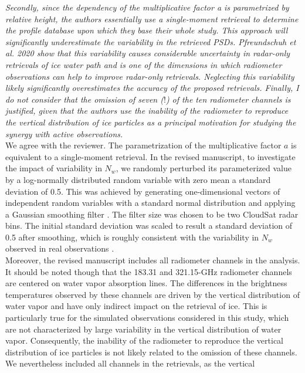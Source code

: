 \documentclass[12pt]{article}
\begin{document}
\noindent \textit{Secondly, since the dependency of the multiplicative factor a is parametrized by relative height,
the authors essentially use a single-moment retrieval to determine the profile database upon
which they base their whole study. This approach will significantly underestimate the variability
in the retrieved PSDs. Pfreundschuh et al. 2020 show that this variability causes considerable
uncertainty in radar-only retrievals of ice water path and is one of the dimensions in which
radiometer observations can help to improve radar-only retrievals. Neglecting this variability
likely significantly overestimates the accuracy of the proposed retrievals.
Finally, I do not consider that the omission of seven ($!$) of the ten radiometer channels is justified,
given that the authors use the inability of the radiometer to reproduce the vertical distribution of
ice particles as a principal motivation for studying the synergy with active observations.}\\
\newline
We agree with the reviewer. The parametrization of the multiplicative factor $a$ is equivalent to a single-moment retrieval. In the revised
manuscript, to investigate the impact of variability in $N_w$, we randomly perturbed its parameterized value by a log-normally distributed
random variable with zero mean a standard deviation of 0.5. This was achieved by generating one-dimensional vectors of independent random variables
with a standard normal distribution and applying a Gaussian smoothing filter \cite{nixon2019}.  The filter size was chosen to be two CloudSat radar bins.
The initial standard deviation was scaled to result a standard deviation of 0.5 after smoothing, which is roughly consistent with the variability
in $N_w$ observed in real observations \cite{grecu2018}. \\
\newline 
Moreover, the revised manuscript includes all radiometer channels in the analysis. It should be noted though that the 183.31 and 321.15-GHz radiometer channels
are centered on water vapor absorption lines. The differences in the brightness temperatures observed by these channels are driven by the vertical distribution
of water vapor and have only indirect impact on the retrieval of ice.  This is particularly true for the simulated observations considered in this study, which
are not characterized by large variability in the vertical distribution of water vapor. Consequently, the inability of the radiometer to reproduce the vertical
distribution of ice particles is not likely related to the omission of these channels. We nevertheless included all channels in the retrievals, as the vertical
\end{document}
